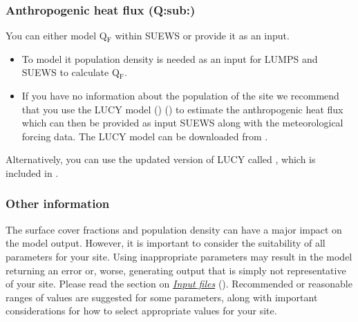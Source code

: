 \documentclass[letterpaper,10pt,english]{sphinxmanual}
\begin{document}
\subsubsection{Anthropogenic heat flux (Q:sub:)}
\label{\detokenize{prepare-to-run-the-model:anthropogenic-heat-flux-qf-1}}\label{\detokenize{prepare-to-run-the-model:anthropogenic-heat-flux-q-sub-f}}
You can either model Q$_{\text{F}}$ within SUEWS or provide it as an input.
\begin{itemize}
\item {} 
To model it population density is needed as an input for LUMPS and
SUEWS to calculate Q$_{\text{F}}$.

\item {} 
If you have no information about the population of the site we
recommend that you use the LUCY model \label{\detokenize{prepare-to-run-the-model:id7}}{\hyperref[\detokenize{references:lucy}]{\sphinxcrossref{{[}lucy{]}}}} ()  \label{\detokenize{prepare-to-run-the-model:id8}}{\hyperref[\detokenize{references:lucy2}]{\sphinxcrossref{{[}lucy2{]}}}} () to estimate the
anthropogenic heat flux which can then be provided as input SUEWS
along with the meteorological forcing data. The LUCY model can be
downloaded from .

\end{itemize}

Alternatively, you can use the updated version of LUCY called
, which is included in
.


\subsubsection{Other information}
\label{\detokenize{prepare-to-run-the-model:other-information}}
The surface cover fractions and population density can have a major
impact on the model output. However, it is important to consider the
suitability of all parameters for your site. Using inappropriate
parameters may result in the model returning an error or, worse,
generating output that is simply not representative of your site. Please
read the section on {\hyperref[\detokenize{prepare-to-run-the-model:Input_files}]{\emph{Input files}}} (). Recommended or
reasonable ranges of values are suggested for some parameters, along
with important considerations for how to select appropriate values for
your site.
\end{document}
